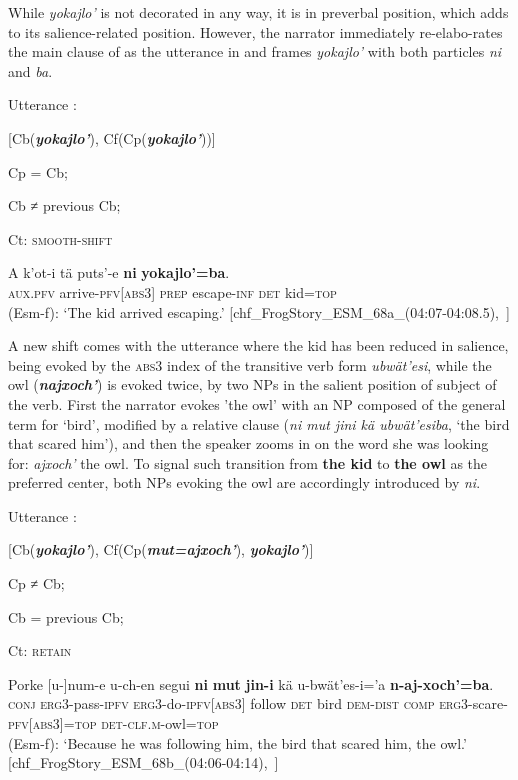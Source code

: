 \documentclass[output=paper
,modfonts
,nonflat]{langsci/langscibook}
\begin{document}
While \textit{yokajlo'} is not decorated in any way, it is in preverbal position, which adds to its salience-related position. However, the narrator immediately re-elabo\hyp{}rates the main clause of  as the utterance in  and frames \textit{yokajlo'} with both particles \textit{ni} and \textit{ba}. 

\ea
Utterance :

[Cb(\textit{\textbf{yokajlo'}}), Cf(Cp(\textit{\textbf{yokajlo'}}))]

Cp = Cb;

Cb ≠ previous Cb; 

Ct: \textsc{smooth-shift}
\z

\ea \label{ex:pico:33}

\gll A k'ot-i tä puts'-e \textbf{ni} \textbf{yokajlo'=ba}. \\
\textsc{aux.pfv} arrive-\textsc{pfv[abs3]} \textsc{prep} escape-\textsc{inf} \textsc{det} {kid}=\textsc{top}\\
\glt (Esm-f): `The kid arrived escaping.' [chf\_FrogStory\_ESM\_68a\_(04:07-04:08.5),~\citealt{Delgado-Galvan2018archive}]

\z


A new shift comes with the utterance  where the kid has been reduced in salience, being evoked by the \textsc{abs3} index of the transitive verb form \textit{ubwät'esi}, while the owl (\textbf{\textit{najxoch'}}) is evoked twice, by two NPs in the salient position of subject of the verb. First the narrator evokes 'the owl' with an NP composed of the general term for `bird', modified by a relative clause (\textit{ni mut jini kä ubwät'esiba}, `the bird that scared him'), and then the speaker zooms in on the word she was looking for: \textit{ajxoch'} the owl. To signal such transition from \textbf{the kid} to \textbf{the owl} as the preferred center, both NPs evoking the owl are accordingly introduced by \textit{ni}. 

\ea
Utterance :

[Cb(\textbf{\textit{yokajlo'}}), Cf(Cp(\textbf{\textit{mut=ajxoch'}}), \textbf{\textit{yokajlo'}})]

Cp ≠ Cb;

Cb = previous Cb; 

Ct: \textsc{retain}
\z

\ea \label{ex:pico:35}

\gll Porke [u-]num-e u-ch-en segui \textbf{ni}   \textbf{mut} \textbf{jin-i} kä u-bwät'es-i='a \textbf{n-aj-xoch'=ba}. \\
\textsc{conj} \textsc{erg3}-pass-\textsc{ipfv} \textsc{erg3}-do-\textsc{ipfv[abs3]} follow \textsc{det} {bird} \textsc{dem-dist} \textsc{comp} \textsc{erg3}-scare-\textsc{pfv[abs3]=top}  \textsc{det}-\textsc{clf.m}-owl=\textsc{top}\\
\glt (Esm-f): `Because he was following him, the bird that scared him, the owl.' [chf\_FrogStory\_ESM\_68b\_(04:06-04:14),~\citealt{Delgado-Galvan2018archive}]
\end{document}
